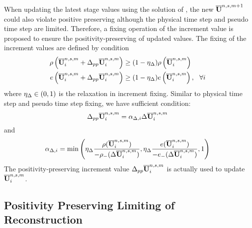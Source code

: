 When updating the latest stage values using the solution of
, the new $\overline{\mathbf{U}}^{n,s,m+1}$ could also 
violate positive preserving although the physical time step and 
pseudo time step are limited.
Therefore, a fixing operation of the increment value is proposed 
to ensure the positivity-preserving of updated values.
The fixing of the increment values are defined by condition
\begin{equation}
    \label{eq:ppLimitInc}
    \begin{aligned}
        \rho\left(\overline{\mathbf{U}}_i^{n,s,m} + \mathrm\Delta_{pp} \overline{\mathbf{U}}_i^{n,s,m}\right)
         & \geq
        (1- \eta_\mathrm\Delta)
        \rho\left(\overline{\mathbf{U}}_i^{n,s,m}\right) \\
        e\left(\overline{\mathbf{U}}_i^{n,s,m} + \mathrm\Delta_{pp} \overline{\mathbf{U}}_i^{n,s,m}\right)
         & \geq
        (1- \eta_\mathrm\Delta)
        e\left(\overline{\mathbf{U}}_i^{n,s,m}\right), \ \ \forall i
    \end{aligned}
\end{equation}
where $\eta_\mathrm\Delta \in (0,1)$ is the relaxation in increment fixing.
Similar to physical time step and pseudo time step fixing, 
we have sufficient condition: 
\begin{equation}
    \mathrm\Delta_{pp} \overline{\mathbf{U}}_i^{n,s,m} = \alpha_{\mathrm\Delta,i} \mathrm\Delta \overline{\mathbf{U}}_i^{n,s,m}
\end{equation} 
and
\begin{equation}
    \alpha_{\mathrm\Delta,i} = \min\left(
        \eta_\mathrm\Delta\frac{\rho(\overline{\mathbf{U}}_i^{n,s,m})}{-\rho_-(\mathrm\Delta \overline{\mathbf{U}}_i^{n,s,m})},
        \eta_\mathrm\Delta\frac{e(\overline{\mathbf{U}}_i^{n,s,m})}{-e_-(\mathrm\Delta \overline{\mathbf{U}}_i^{n,s,m})},
        1
        \right)
\end{equation}
The positivity-preserving increment value $\mathrm\Delta_{pp} \overline{\mathbf{U}}_i^{n,s,m}$
is actually used to update $\overline{\mathbf{U}}_i^{n,s,m}$.

\subsection{Positivity Preserving Limiting of Reconstruction}

